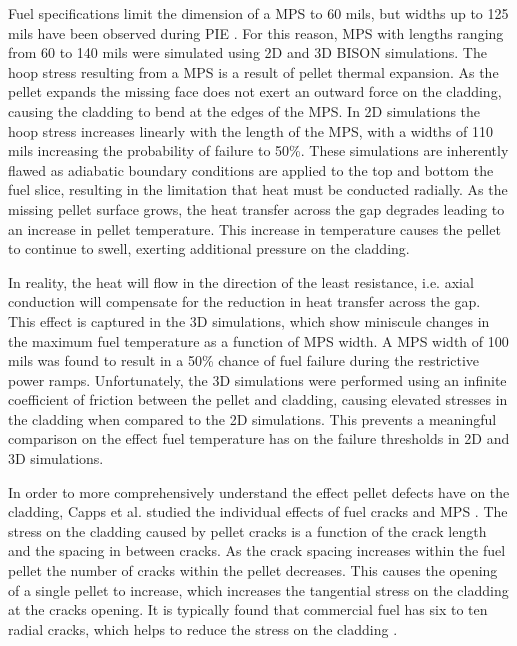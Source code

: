 \documentclass[edeposit,fullpage,11pt]{uiucthesis2009}
\begin{document}
Fuel specifications limit the dimension of a \gls{MPS} to 60 mils, but widths up to 125 mils have been observed during \gls{PIE} \cite{aleshin_effect_2010}.
For this reason, \gls{MPS} with lengths ranging from 60 to 140 mils were simulated using 2D and 3D BISON simulations. 
The hoop stress resulting from a \gls{MPS} is a result of pellet thermal expansion. 
As the pellet expands the missing face does not exert an outward force on the cladding, causing the cladding to bend at the edges of the \gls{MPS}.
In 2D simulations the hoop stress increases linearly with the length of the \gls{MPS}, with a widths of 110 mils increasing the probability of failure to 50\%.
These simulations are inherently flawed as adiabatic boundary conditions are applied to the top and bottom the fuel slice, resulting in the limitation that heat must be conducted radially.
As the missing pellet surface grows, the heat transfer across the gap degrades leading to an increase in pellet temperature.
This increase in temperature causes the pellet to continue to swell, exerting additional pressure on the cladding.

In reality, the heat will flow in the direction of the least resistance, i.e. axial conduction will compensate for the reduction in heat transfer across the gap.
This effect is captured in the 3D simulations, which show miniscule changes in the maximum fuel temperature as a function of \gls{MPS} width.
A \gls{MPS} width of 100 mils was found to result in a 50\% chance of fuel failure during the restrictive power ramps.
Unfortunately, the 3D simulations were performed using an infinite coefficient of friction between the pellet and cladding, causing elevated stresses in the cladding when compared to the 2D simulations.
This prevents a meaningful comparison on the effect fuel temperature has on the failure thresholds in 2D and 3D simulations.


In order to more comprehensively understand the effect pellet defects have on the cladding, Capps et al. studied the individual effects of fuel cracks and \gls{MPS} \cite{capps_evaluation_2016}.
The stress on the cladding caused by pellet cracks is a function of the crack length and the spacing in between cracks.
As the crack spacing increases within the fuel pellet the number of cracks within the pellet decreases.
This causes the opening of a single pellet to increase, which increases the tangential stress on the cladding at the cracks opening.
It is typically found that commercial fuel has six to ten radial cracks, which helps to reduce the stress on the cladding \cite{oguma_cracking_1983}. 
\end{document}
